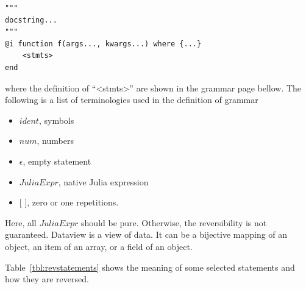 \documentclass{article}
\newcommand{\<}{\langle}
\renewcommand{\>}{\rangle}
\newcommand{\Tbl}[1]{Table~\ref{#1}}
\theoremstyle{definition}\newtheorem{definition}{\textit{Definition}}
\begin{document}
\begin{minipage}{.88\columnwidth}
\begin{lstlisting}[basicstyle=\small\ttfamily,columns=fullflexible]
"""
docstring...
"""
@i function f(args..., kwargs...) where {...}
    <stmts>
end
\end{lstlisting}
\end{minipage}
where the definition of ``<stmts>'' are shown in the grammar page bellow.
The following is a list of terminologies used in the definition of grammar
\begin{itemize}
    \item $ident$, symbols
    \item $num$, numbers
    \item $\epsilon$, empty statement
    \item $JuliaExpr$, native Julia expression
    \item $[$ $]$,  zero or one repetitions.
\end{itemize}
Here, all $JuliaExpr$ should be pure. Otherwise, the reversibility is not guaranteed.
Dataview is a view of data. It can be a bijective mapping of an object, an item of an array, or a field of an object.

\newpage

\begin{minipage}{0.6\textwidth}
    \small

\end{minipage}

\Tbl{tbl:revstatements} shows the meaning of some selected statements and how they are reversed.
\end{document}
